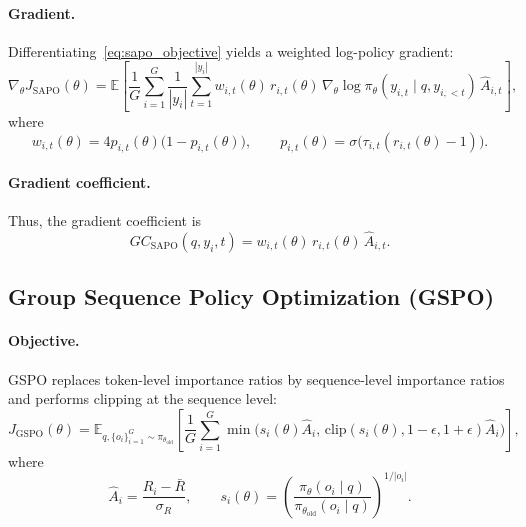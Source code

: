 \documentclass{article}
\begin{document}
\paragraph{Gradient.}
Differentiating~\eqref{eq:sapo_objective} yields a weighted log-policy gradient:
\begin{equation}
\nabla_\theta J_{\mathrm{SAPO}}(\theta)
=
\mathbb{E}
\left[
\frac{1}{G}
\sum_{i=1}^G
\frac{1}{|y_i|}
\sum_{t=1}^{|y_i|}
w_{i,t}(\theta)\,r_{i,t}(\theta)\,
\nabla_\theta \log \pi_\theta(y_{i,t}\mid q,y_{i,<t})\,
\hat A_{i,t}
\right],
\label{eq:sapo_gradient}
\end{equation}
where
\begin{equation}
w_{i,t}(\theta)
=
4p_{i,t}(\theta)\bigl(1-p_{i,t}(\theta)\bigr),
\qquad
p_{i,t}(\theta)=\sigma\!\bigl(\tau_{i,t}(r_{i,t}(\theta)-1)\bigr).
\label{eq:sapo_weight}
\end{equation}

\paragraph{Gradient coefficient.}
Thus, the gradient coefficient is
\begin{equation}
GC_{\mathrm{SAPO}}(q,y_i,t)
=
w_{i,t}(\theta)\,r_{i,t}(\theta)\,\hat A_{i,t}.
\label{eq:sapo_gc}
\end{equation}

\subsection{Group Sequence Policy Optimization (GSPO)}

\paragraph{Objective.}
GSPO replaces token-level importance ratios by sequence-level importance ratios and performs
clipping at the sequence level:
\begin{equation}
J_{\mathrm{GSPO}}(\theta)
=
\mathbb{E}_{q,\{o_i\}_{i=1}^G\sim \pi_{\theta_{\mathrm{old}}}}
\left[
\frac{1}{G}
\sum_{i=1}^G
\min\!\bigl(
s_i(\theta)\hat A_i,\,
\mathrm{clip}(s_i(\theta),1-\epsilon,1+\epsilon)\hat A_i
\bigr)
\right],
\label{eq:gspo_objective}
\end{equation}
where
\begin{equation}
\hat A_i=\frac{R_i-\bar R}{\sigma_R},
\qquad
s_i(\theta)
=
\left(
\frac{\pi_\theta(o_i\mid q)}
{\pi_{\theta_{\mathrm{old}}}(o_i\mid q)}
\right)^{1/|o_i|}.
\label{eq:gspo_advantage_ratio}
\end{equation}
\end{document}
